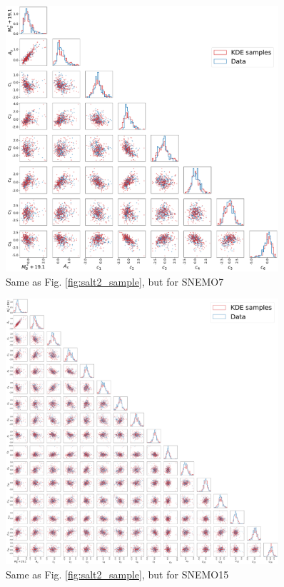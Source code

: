 \begin{figure}
    \centering
\includegraphics[width=0.9\textwidth]{figures/snemo_kde/snemo7_corner.pdf}
    \caption{Same as Fig. \ref{fig:salt2_sample}, but for SNEMO7}
    \label{fig:snemo7_sample}
\end{figure}

\begin{figure}
    \centering
\includegraphics[width=0.9\textwidth]{figures/snemo_kde/snemo15_corner.pdf}
    \caption{Same as Fig. \ref{fig:salt2_sample}, but for SNEMO15}
    \label{fig:snemo15_sample}
\end{figure}

